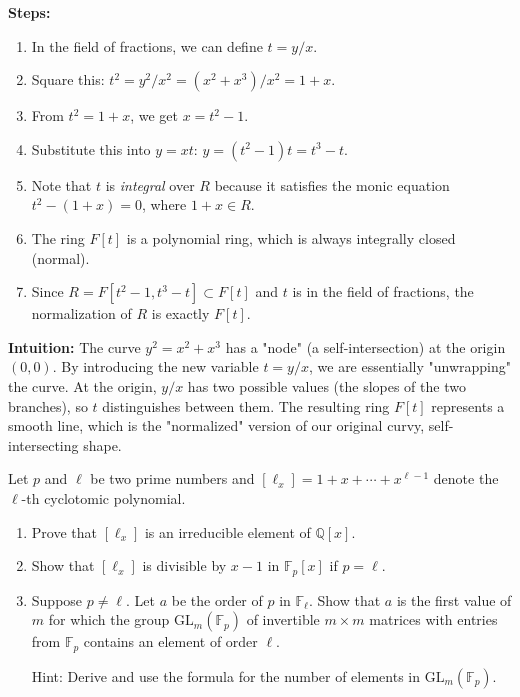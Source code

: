\begin{solution}
\textbf{Steps:}
\begin{enumerate}
    \item In the field of fractions, we can define $t = y/x$.
    \item Square this: $t^2 = y^2/x^2 = (x^2 + x^3)/x^2 = 1 + x$.
    \item From $t^2 = 1+x$, we get $x = t^2 - 1$.
    \item Substitute this into $y = xt$: $y = (t^2 - 1)t = t^3 - t$.
    \item Note that $t$ is \textit{integral} over $R$ because it satisfies the monic equation $t^2 - (1+x) = 0$, where $1+x \in R$.
    \item The ring $F[t]$ is a polynomial ring, which is always integrally closed (normal).
    \item Since $R = F[t^2-1, t^3-t] \subset F[t]$ and $t$ is in the field of fractions, the normalization of $R$ is exactly $F[t]$.
\end{enumerate}

\textbf{Intuition:}
The curve $y^2 = x^2 + x^3$ has a "node" (a self-intersection) at the origin $(0,0)$. By introducing the new variable $t = y/x$, we are essentially "unwrapping" the curve. At the origin, $y/x$ has two possible values (the slopes of the two branches), so $t$ distinguishes between them. The resulting ring $F[t]$ represents a smooth line, which is the "normalized" version of our original curvy, self-intersecting shape.
\end{solution}

\begin{exercise}
\label{algebra:2020:4}
Let $p$ and $\ell$ be two prime numbers and $[\ell_x] = 1 + x + \cdots + x^{\ell-1}$ denote the $\ell$-th cyclotomic polynomial.

\begin{enumerate}
\item Prove that $[\ell_x]$ is an irreducible element of $\mathbb{Q}[x]$.

\item Show that $[\ell_x]$ is divisible by $x - 1$ in $\mathbb{F}_p[x]$ if $p = \ell$.

\item Suppose $p \neq \ell$. Let $a$ be the order of $p$ in $\mathbb{F}_\ell$. Show that $a$ is the first value of $m$ for which the group $\mathrm{GL}_m(\mathbb{F}_p)$ of invertible $m \times m$ matrices with entries from $\mathbb{F}_p$ contains an element of order $\ell$.

Hint: Derive and use the formula for the number of elements in $\mathrm{GL}_m(\mathbb{F}_p)$.
\end{enumerate}
\end{exercise}

